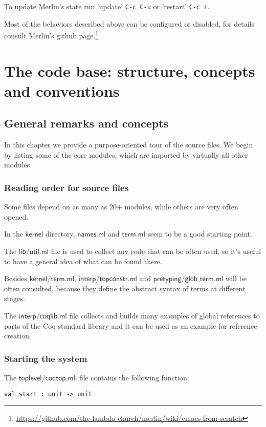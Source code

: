 \documentclass[a4paper,oneside]{book}
\newcommand{\m}[1]{\ensuremath{\mathsf{#1}}}
\begin{document}
To update Merlin's state run 'update' \verb|C-c C-u| or 'restart'
\verb|C-c r|.

Most of the behaviors described above can be configured or disabled,
for details consult Merlin's github
page.\footnote{\url{https://github.com/the-lambda-church/merlin/wiki/emacs-from-scratch}}

\part{The code base: structure, concepts and conventions}

\chapter{General remarks and concepts}

In this chapter we provide a purpose-oriented tour of the source
files. We begin by listing some of the core modules, which are
imported by virtually all other modules.

\section{Reading order for source files}

Some files depend on as many as 20+ modules, while others are very
often opened. 

In the \m{kernel} directory, \m{names.ml} and \m{term.ml} seem to be a
good starting point.

The \m{lib/util.ml} file is used to collect any code that can be often
used, so it's useful to have a general idea of what can be found there.

Besides \m{kernel/term.ml}, \m{interp/topconstr.ml} and
\m{pretyping/glob\_term.ml} will be often consulted, because they
define the abstract syntax of terms at different stages.

The \m{interp/coqlib.ml} file collects and builds many examples of
global references to parts of the Coq standard library and it can be
used as an example for reference creation.

\newpage

\section{Starting the system}

The \m{toplevel/coqtop.mli} file contains the following function:

\begin{lstlisting}
val start : unit -> unit
\end{lstlisting}
\end{document}
